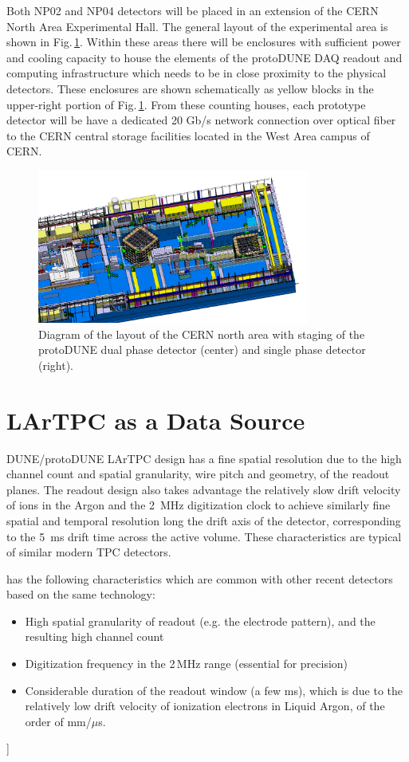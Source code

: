 \documentclass[a4paper]{jpconf}
\newcommand{\Omit}[1]{}
\newcommand{\pd}{protoDUNE\xspace}
\begin{document}
Both NP02 and NP04 detectors will be placed in an extension of the CERN North Area Experimental Hall.
The general layout of the experimental area is shown in Fig.\,\ref{fig:np02np04}.
Within these areas there will be enclosures with sufficient power and cooling capacity to house
the elements of the \pd DAQ readout and computing infrastructure which
needs to be in close proximity to the physical detectors.
These enclosures are shown schematically as yellow blocks in the
upper-right portion of Fig.\,\ref{fig:np02np04}. From these counting
houses, each prototype detector will be have a dedicated 20 Gb/s
network connection over optical fiber to the CERN central storage
facilities located in the West Area campus of CERN.  

\begin{figure}[tb]
\centering\includegraphics[width=0.8\textwidth]{figures/np02np04.png}
\caption{\label{fig:np02np04}Diagram of the layout of the CERN north area with
  staging of the protoDUNE dual phase detector (center) and single
  phase detector (right).}
\end{figure}

\section{LArTPC as a Data Source}

DUNE/\pd LArTPC design has a fine spatial resolution due to the high
channel count and spatial granularity, wire pitch and geometry, of the readout
planes.  The readout design also takes advantage the relatively slow
drift velocity of ions in the Argon and the 2~MHz digitization clock
to achieve similarly fine spatial and temporal resolution long the
drift axis of the detector, corresponding to the 5~ms drift time across
the active volume.  These characteristics are typical of
similar modern TPC detectors.

\Omit[  has the following characteristics which are common with
other recent detectors based on the same technology:
\begin{itemize}
\item High spatial granularity of readout (e.g. the electrode pattern), and the resulting high channel count
\item Digitization frequency in the 2\,MHz range (essential for precision)
\item Considerable duration of the readout window (a few ms), which is due to the relatively
low drift velocity of ionization electrons in Liquid Argon, of the order of mm/$\mu$s.
\end{itemize}
]
\end{document}
